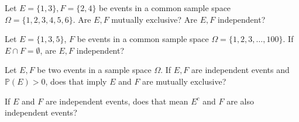\documentclass[../main.tex]{subfiles}
\begin{document}
\begin{example}
  Let \(E = \{1,3\}, F = \{2,4\}\) be events in a common sample space \(\Omega = \{1,2,3,4,5,6\}\).  Are \(E,F\) mutually exclusive? Are \(E,F\) independent?
\end{example}
\clearpage

\begin{example}
  Let \(E = \{1,3,5\}\), \(F\) be events in a common sample space \(\Omega = \{1,2,3,\ldots,100\}\).  If \(E \cap F = \emptyset\), are \(E,F\) independent?

\end{example}

\begin{example} 
  Let \(E,F\) be two events in a sample space \(\Omega\). If \(E,F\) are independent events and \(\mathbb{P}(E) > 0\), does that imply \(E\) and \(F\) are mutually exclusive?

\end{example}

\begin{example}
  If \(E\) and \(F\) are independent events, does that mean \(E^{c}\) and \(F\) are also independent events?

\end{example}
\end{document}
